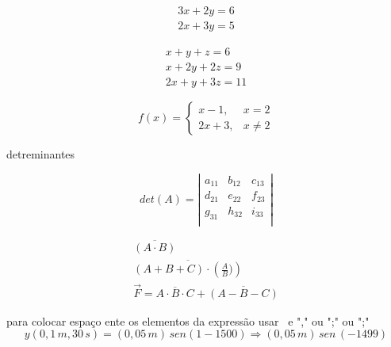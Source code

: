 \documentclass[12pt, a4paper, oneside]{article}
\begin{document}

\begin{eqnarray}
      3x+2y =6\\
      2x+3y = 5
\end{eqnarray}

\vspace{1,0cm}

\begin{eqnarray}
x + y + z = 6\\
  x + 2y + 2z =9\\
  2x + y + 3z = 11
\end{eqnarray}

\vspace{1,0cm}


\begin{equation}
f(x)=
\left\lbrace
\begin{array}{cc}
x - 1, & x = 2 \\
2x +3, & x \neq 2
 \end{array}
\right.
\end{equation}

\vspace{1,0cm}
\begin{center}
detreminantes
\end{center}

\begin{equation}
det(A)= 
\left\vert
\begin{array}{lcr}
a_{11} & b_{12} & c_{13}\\
d_{21} & e_{22} & f_{23}\\
g_{31} & h_{32} & i_{33}\\
\end{array}
\right\vert
\end{equation}

\vspace{1,0cm}

\begin{eqnarray} %
\overline{(A \cdot B)}\\
\overline{( A + B + C) \cdot \left(\frac{A}{B})\right)}\\
\vec{F}= \overline{A \cdot B \cdot C} + \overline{(A-B-C)}
\end{eqnarray}

\vspace{1,0cm}

para colocar espaço ente os elementos da expressão usar \ e "," ou ";" ou ";"
\vspace{1,0cm}
\begin{equation}
y(0,1\,m,30\,s) = (0,05\,m)\,sen(1 - 1500)\Rightarrow (0,05\, m)\,sen\,(-1499)
\end{equation}
\end{document}
